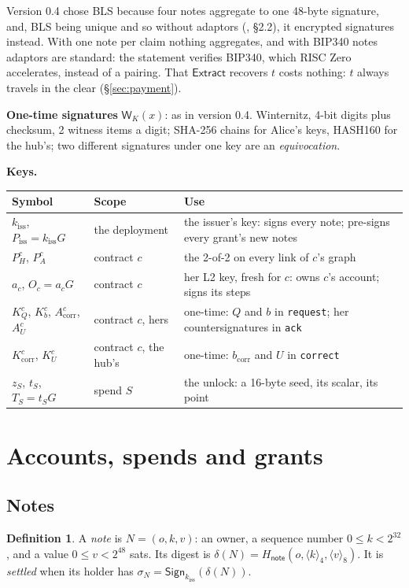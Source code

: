 \documentclass[11pt]{article}
\theoremstyle{plain}
\theoremstyle{definition}
\newtheorem{definition}{Definition}
\newcommand{\bcorr}{b_{\mathrm{corr}}}
\newcommand{\tx}[1]{\texttt{#1}}
\newcommand{\be}[2]{\langle #1\rangle_{#2}}
\newcommand{\Ht}[1]{H_{\textsf{#1}}}
\newcommand{\Sign}{\mathsf{Sign}}
\newcommand{\Extr}{\mathsf{Extract}}
\newcommand{\Wots}{\mathsf{W}}
\newcommand{\kiss}{k_{\mathrm{iss}}}
\newcommand{\Piss}{P_{\mathrm{iss}}}
\newcommand{\PH}{P_H^{c}}
\newcommand{\Oc}{O_c}
\newcommand{\KQ}{K_{Q}^{c}}
\newcommand{\Kb}{K_{b}^{c}}
\newcommand{\Kcorr}{K_{\mathrm{corr}}^{c}}
\newcommand{\KU}{K_{U}^{c}}
\newcommand{\Acorr}{A_{\mathrm{corr}}^{c}}
\newcommand{\AU}{A_{U}^{c}}
\begin{document}
Version 0.4 chose BLS because four notes aggregate to one 48-byte
signature, and, BLS being unique and so without adaptors
(\cite{grants04}, \S2.2), it encrypted signatures instead. With one note
per claim nothing aggregates, and with BIP340 notes adaptors are
standard: the statement verifies BIP340, which RISC Zero accelerates,
instead of a pairing. That $\Extr$ recovers $t$ costs nothing: $t$
always travels in the clear (\S\ref{sec:payment}).

\textbf{One-time signatures} $\Wots_K(x)$: as in version 0.4. Winternitz,
4-bit digits plus checksum, 2 witness items a digit; SHA-256 chains for
Alice's keys, HASH160 for the hub's; two different signatures under one
key are an \emph{equivocation}.

\textbf{Keys.}
\begin{center}
\begin{tabularx}{\linewidth}{llL}
\toprule
Symbol & Scope & Use \\
\midrule
$\kiss$, $\Piss = \kiss G$ & the deployment & the issuer's key: signs every note; pre-signs every grant's new notes \\
$\PH$, $P_A^c$ & contract $c$ & the 2-of-2 on every link of $c$'s graph \\
$a_c$, $\Oc = a_cG$ & contract $c$ & her L2 key, fresh for $c$: owns $c$'s account; signs its steps \\
$\KQ$, $\Kb$, $\Acorr$, $\AU$ & contract $c$, hers & one-time: $Q$ and $b$ in \tx{request}; her countersignatures in \tx{ack} \\
$\Kcorr$, $\KU$ & contract $c$, the hub's & one-time: $\bcorr$ and $U$ in \tx{correct} \\
$z_S$, $t_S$, $T_S = t_S G$ & spend $S$ & the unlock: a 16-byte seed, its scalar, its point \\
\bottomrule
\end{tabularx}
\end{center}

\section{Accounts, spends and grants}

\subsection{Notes}\label{sec:notes}

\begin{definition}
A \emph{note} is $N = (o, k, v)$: an owner, a sequence number $0 \le k <
2^{32}$, and a value $0 \le v < 2^{48}$ sats. Its digest is $\delta(N) =
\Ht{note}(o, \be{k}{4}, \be{v}{8})$. It is \emph{settled} when its
holder has $\sigma_N = \Sign_{\kiss}(\delta(N))$.
\end{definition}
\end{document}
